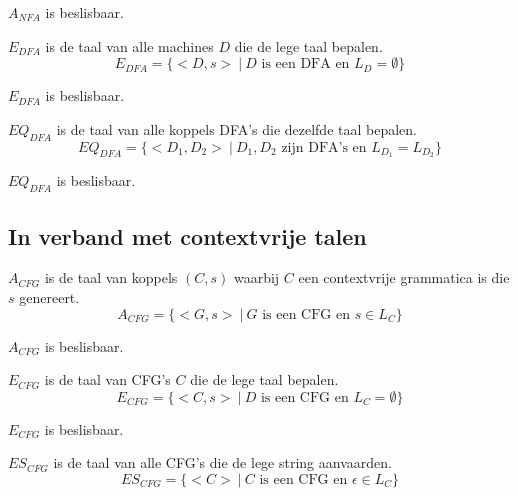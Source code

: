 \documentclass[main.tex]{subfiles}
\begin{document}
\begin{st}
  $A_{NFA}$ is beslisbaar.
\end{st}


\begin{de}
  $E_{DFA}$ is de taal van alle machines $D$ die de lege taal bepalen.
  \[ E_{DFA} = \{ <D,s>\ |\ D \text{ is een DFA en } L_{D} = \emptyset \} \]
\end{de}

\begin{st}
  $E_{DFA}$ is beslisbaar.
\end{st}

\begin{de}
  $EQ_{DFA}$ is de taal van alle koppels DFA's die dezelfde taal bepalen.
  \[ EQ_{DFA} = \{ <D_{1},D_{2}> \ |\ D_{1},D_{2} \text{ zijn DFA's en } L_{D_{1}} = L_{D_{2}} \} \]  
\end{de}

\begin{st}
  $EQ_{DFA}$ is beslisbaar.
\end{st}

\subsection{In verband met contextvrije talen}
\label{sec:verb-met-cont}

\begin{de}
  \label{de:a-cfg}
  $A_{CFG}$ is de taal van koppels $(C,s)$ waarbij $C$ een contextvrije grammatica is die $s$ genereert.
  \[ A_{CFG} = \{ <G,s> \ |\ G \text{ is een CFG en } s \in L_{C} \} \]
\end{de}

\begin{st}
  $A_{CFG}$ is beslisbaar.
\end{st}

\begin{de}
  $E_{CFG}$ is de taal van CFG's $C$ die de lege taal bepalen.
  \[ E_{CFG} = \{ <C,s>\ |\ D \text{ is een CFG en } L_{C} = \emptyset \} \]
\end{de}

\begin{st}
  $E_{CFG}$ is beslisbaar.
\end{st}

\begin{de}
  $ES_{CFG}$ is de taal van alle CFG's die de lege string aanvaarden.
  \[ ES_{CFG} = \{ <C> \ |\ C \text{ is een CFG en } \epsilon \in L_{C}\} \]
\end{de}
\end{document}
